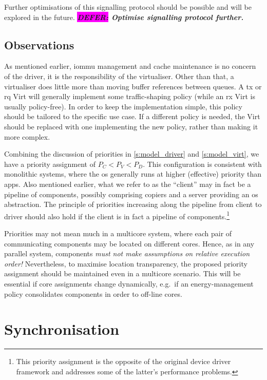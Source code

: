 \documentclass[a4paper,12pt]{report}
\newcommand{\DEFER}[1]{\textbf{\textsl{\colorbox{magenta}{DEFER:} #1}}}
\newcommand{\DEFER}[1]{\relax}
\begin{document}
Further optimisations of this signalling protocol should be possible
and will be explored in the future. \DEFER{Optimise signalling
  protocol further.}

\subsection{Observations}\label{s:mux}
As mentioned earlier, \gls{iommu} management and cache maintenance is no concern of the
driver, it is the responsibility of the virtualiser.
Other than that,
a virtualiser does little more than moving buffer references between
queues.  A
\gls{tx} or \gls{rq} Virt will generally implement some traffic-shaping policy
(while an \gls{rx} Virt is usually policy-free).
In order to keep the implementation simple, this policy should be
tailored to the specific use case. If a different policy is needed,
the Virt should be replaced with one implementing the new policy,
rather than making it more complex.

Combining the discussion of priorities in \autoref{s:model_driver} and \autoref{s:model_virt},
we have a priority assignment of \(P_C<P_V<P_D\).
This configuration is consistent
with monolithic systems, where the \gls{os} generally runs at higher
(effective) priority than apps.
Also mentioned earlier, what we refer to as the ``client'' may in fact
be a pipeline of components, possibly comprising
copiers and a server providing an \gls{os} abstraction.  The principle of priorities increasing along
the pipeline from client to driver should also hold if the client is
in fact a pipeline of components.\footnote{This
  priority assignment is the opposite of the original device driver
  framework and addresses some of the latter's performance problems.}

Priorities may not mean much in a multicore system, where each
pair of communicating components may be located on different
cores. Hence, as in any parallel system, components \emph{must not
  make assumptions on relative execution order!} Nevertheless, to
maximise location transparency, the proposed priority assignment
should be maintained even in a multicore scenario. This will be
essential if core assignments change dynamically, e.g.\ if an
energy-management policy consolidates components in order to off-line
cores.

\section{Synchronisation}\label{s:sync}
\end{document}
